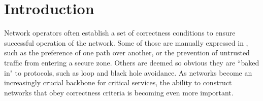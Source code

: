 \section{Introduction}
\label{sec:intro}



Network operators often establish a set of correctness conditions to ensure 
successful operation of the network.
Some of those are manually expressed in , such as
the preference of one path over another, or the prevention of untrusted traffic
from entering a secure zone. Others are deemed so obvious they are ``baked in"
to protocols, such as loop
and black hole avoidance. As networks become an increasingly crucial backbone for
critical services,
the ability to construct networks that obey correctness criteria is becoming
even more important. 

